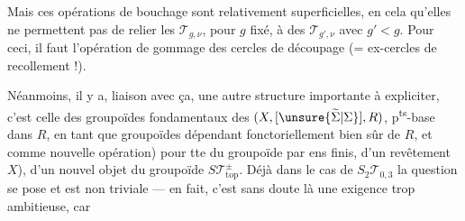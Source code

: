 Mais ces opérations de bouchage sont relativement superficielles, en cela qu'elles ne permettent pas de relier les $\mathcal T_{g,\nu}$, pour $g$ fixé, à des $\mathcal T_{g',\nu}$ avec $g'<g$. Pour ceci, il faut l'opération  de gommage des cercles de découpage (= ex-cercles de recollement !).

Néanmoins, il y a,   liaison avec ça, une autre structure importante à expliciter, c'est celle des  groupoïdes fondamentaux  des $(X,[\unsure{\widetilde{\Sigma}|\Sigma}],R)$, p\textsuperscript{ts}-base dans $R$,  en tant que groupoïdes dépendant fonctoriellement bien sûr de $R$, et  comme nouvelle opération) pour tte   du groupoïde par ens finis, \inserted{[\unsure{définissant un}} d'un revêtement   $X$), d'un nouvel objet du  groupoïde $S\mathcal T_{\mathrm{top}}^\pm$. Déjà dans le cas de $S_2\mathcal T_{0,3}$ la question se pose et est non triviale --- en fait, c'est sans doute là une exigence trop ambitieuse, car

